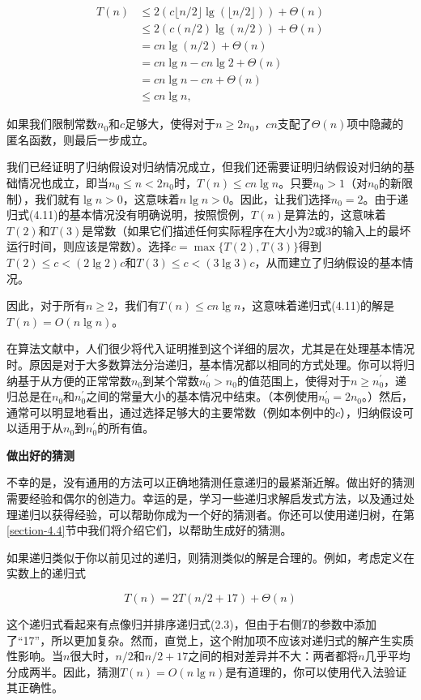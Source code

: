 \documentclass[lang=cn,newtx,10pt,scheme=chinese]{elegantbook}
\begin{document}
$$
\begin{aligned}
T(n) & \leq 2(c\lfloor n / 2\rfloor \lg (\lfloor n / 2\rfloor))+\Theta(n) \\
& \leq 2(c(n / 2) \lg (n / 2))+\Theta(n) \\
& =c n \lg (n / 2)+\Theta(n) \\
& =c n \lg n-c n \lg 2+\Theta(n) \\
& =c n \lg n-c n+\Theta(n) \\
& \leq c n \lg n,
\end{aligned}
$$

如果我们限制常数$n_0$和$c$足够大，使得对于$n \geq 2 n_0$，$c n$支配了$\Theta(n)$项中隐藏的匿名函数，则最后一步成立。

我们已经证明了归纳假设对归纳情况成立，但我们还需要证明归纳假设对归纳的基础情况也成立，即当$n_0 \leq n<2 n_0$时，$T(n) \leq c n \lg n$。只要$n_0>1$（对$n_0$的新限制），我们就有$\lg n>0$，这意味着$n \lg n>0$。因此，让我们选择$n_0=2$。由于递归式(4.11)的基本情况没有明确说明，按照惯例，$T(n)$是算法的，这意味着$T(2)$和$T(3)$是常数（如果它们描述任何实际程序在大小为2或3的输入上的最坏运行时间，则应该是常数）。选择$c=\max \{T(2), T(3)\}$得到$T(2) \leq c<(2 \lg 2) c$和$T(3) \leq c<(3 \lg 3) c$，从而建立了归纳假设的基本情况。

因此，对于所有$n \geq 2$，我们有$T(n) \leq c n \lg n$，这意味着递归式(4.11)的解是$T(n)=O(n \lg n)$。

在算法文献中，人们很少将代入证明推到这个详细的层次，尤其是在处理基本情况时。原因是对于大多数算法分治递归，基本情况都以相同的方式处理。你可以将归纳基于从方便的正常常数$n_0$到某个常数$n_0^{\prime}>n_0$的值范围上，使得对于$n \geq n_0^{\prime}$，递归总是在$n_0$和$n_0^{\prime}$之间的常量大小的基本情况中结束。（本例使用$n_0^{\prime}=2 n_0$。）然后，通常可以明显地看出，通过选择足够大的主要常数（例如本例中的$c$），归纳假设可以适用于从$n_0$到$n_0^{\prime}$的所有值。

\textbf{做出好的猜测}

不幸的是，没有通用的方法可以正确地猜测任意递归的最紧渐近解。做出好的猜测需要经验和偶尔的创造力。幸运的是，学习一些递归求解启发式方法，以及通过处理递归以获得经验，可以帮助你成为一个好的猜测者。你还可以使用递归树，在第\ref{section-4.4}节中我们将介绍它们，以帮助生成好的猜测。

如果递归类似于你以前见过的递归，则猜测类似的解是合理的。例如，考虑定义在实数上的递归式

$$
T(n)=2 T(n / 2+17)+\Theta(n)
$$

这个递归式看起来有点像归并排序递归式(2.3)，但由于右侧$T$的参数中添加了``17''，所以更加复杂。然而，直觉上，这个附加项不应该对递归式的解产生实质性影响。当$n$很大时，$n / 2$和$n / 2+17$之间的相对差异并不大：两者都将$n$几乎平均分成两半。因此，猜测$T(n)=O(n \lg n)$是有道理的，你可以使用代入法验证其正确性。
\end{document}
